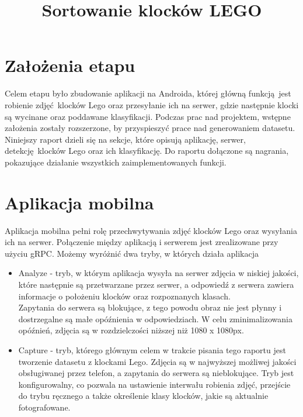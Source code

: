\documentclass[]{article}
\title{Sortowanie klocków LEGO}
\author{}
\begin{document}
	
	\maketitle
	
	\begin{abstract}
		
	\end{abstract}
	
	\section{Założenia etapu}
	Celem etapu było zbudowanie aplikacji na Androida, której główną funkcją jest robienie zdjęć klocków Lego oraz przesyłanie ich na serwer, gdzie następnie klocki są wycinane oraz poddawane klasyfikacji. Podczas prac nad projektem, wstępne założenia zostały rozszerzone, by przyspieszyć prace nad generowaniem datasetu. 
	Niniejszy raport dzieli się na sekcje, które opisują aplikację, serwer, detekcję klocków Lego oraz ich klasyfikację.
	Do raportu dołączone są nagrania, pokazujące działanie wszystkich zaimplementowanych funkcji.  
	
	\section{Aplikacja mobilna}
	Aplikacja mobilna pełni rolę przechwytywania zdjęć klocków Lego oraz wysyłania ich na serwer. Połączenie między aplikacją i serwerem jest zrealizowane przy użyciu gRPC. 
	Możemy wyróżnić dwa tryby, w których działa aplikacja
	\begin{itemize}
		\item Analyze - tryb, w którym aplikacja wysyła na serwer zdjęcia w niskiej jakości, które następnie są przetwarzane przez serwer, a odpowiedź z serwera zawiera informacje o położeniu klocków oraz rozpoznanych klasach. \\
		Zapytania do serwera są blokujące, z tego powodu obraz nie jest płynny i dostrzegalne są małe opóźnienia w odpowiedziach. W celu zminimalizowania opóźnień, zdjęcia są w rozdzielczości niższej niż 1080 x 1080px.
		\item Capture - tryb, którego głównym celem w trakcie pisania tego raportu jest tworzenie datasetu z klockami Lego. Zdjęcia są w najwyższej możliwej jakości obsługiwanej przez telefon, a zapytania do serwera są nieblokujące. Tryb jest konfigurowalny, co pozwala na ustawienie interwału robienia zdjęć, przejście do trybu ręcznego a także określenie klasy klocków, jakie są aktualnie fotografowane.
	\end{itemize}
	
\end{document}
